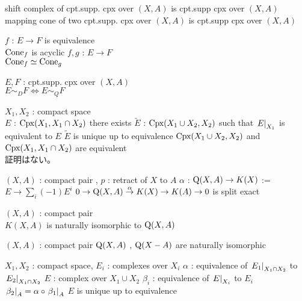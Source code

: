 \documentclass[dvipdfmx]{jsarticle}
\begin{document}
\begin{Theorem}
\itemprop shift complex of cpt.supp. cpx over \((X,A)\) is cpt.supp cpx over \((X,A)\)
\itemprop mapping cone of two cpt.supp. cpx over \((X,A)\) is cpt.supp cpx over \((X,A)\)
\end{Theorem}

\begin{Theorem}
\itemprop
  \IfHold \(f\) : \(E \to F\) is equivalence \\
  \Then \(\text{Cone}_{f}\) is acyclic 
\itemprop
  \For \(f,g\) : \(E \to F\) \\
  \Then \(\text{Cone}_{f} \simeq \text{Cone}_{g}\)
\end{Theorem}

\begin{Theorem}[二つの定義の同値性]
\itemprop
  \For \(E,F\) : cpt.supp. cpx over \((X,A)\) \\
  \Then \(E \sim_{D} F \Leftrightarrow E \sim_{Q} F\)
\end{Theorem}

\begin{Theorem}[A.2]
\itemwhen 
  \Fix \(X_1 , X_2\) : compact space \\
  \Fix \(E\) : \(\text{Cpx}(X_1, X_1 \cap X_2)\)
\itemprop
  \Then there exists \(\tilde{E}\) : \(\text{Cpx}(X_1 \cup X_2, X_2)\) such that \(\left. {E} \right| _{X_1}\) is equivalent to \(E\)
\itemprop
  \Then \(\tilde{E}\) is unique up to equivalence
\itemnote
  \(\text{Cpx}(X_1 \cup X_2, X_2)\) and \(\text{Cpx}(X_1, X_1 \cap X_2)\) are equivalent \\
  証明はない。
\end{Theorem}

\begin{Theorem}[A.3]
\itemwhen \((X,A)\) : compact pair , \(p\) : retract of \(X\) to \(A\)
\itemdefi \(\alpha\) : \(\text{Q}(X, A) \to K(X)\) := \(E \to \sum_i (-1) E^i\)
\itemprop \(0 \to \text{Q}(X, A) \overset{\alpha}{\to} K(X) \to K(A) \to 0\) is split exact 
\end{Theorem}

\begin{Theorem}[A.I]
\itemprop
  \For \((X,A)\) : compact pair \\
  \Then \(K(X,A)\) is naturally isomorphic to \(\text{Q}(X, A)\)
\end{Theorem}

\begin{Theorem}[(A.4)]
\itemdefi \((X,A)\) : compact pair
\itemprop \(\text{Q}(X, A)\) , \(\text{Q}(X-A)\) are naturally isomorphic
\end{Theorem}

\begin{Theorem}
\itemenum \(X_1,X_2\) : compact space, \(E_i\) : complexes over \(X_i\)
\itemenum \(\alpha\) : equivalence of \(\left. {E_1} \right| _{X_1 \cap X_2}\) to \(\left. {E_2} \right| _{X_1 \cap X_2}\)
\itemthen \THENLINE
\itemenum \(E\) : complex over \(X_1 \cup X_2\)
\itemenum \(\beta_i\) : equivalence of \(\left. {E} \right| _{X_i}\) to \(E_i\)
\itemwith \(\left. {\beta_2} \right| _{A} = \alpha \circ \left. {\beta_1} \right| _{A}\)
\itemwith \(E\) is unique up to equivalence
\end{Theorem}
\end{document}

